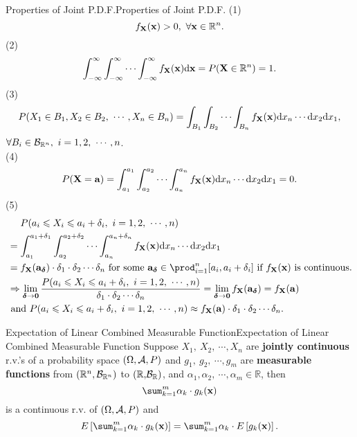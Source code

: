 \documentclass{elegantbook}
\begin{document}
\begin{remark}{Properties of Joint P.D.F.}{Properties of Joint P.D.F.}
(1)
\[f_{\mX}(\mx) > 0,\ \forall\mx \in \mathbb{R}^{n}.\]
(2)
\[\int_{- \infty}^{\infty}{\int_{- \infty}^{\infty}{\cdots\int_{- \infty}^{\infty}{f_{\mX}(\mx)\dif\mx}}} = P(\mX \in \mathbb{R}^{n}) = 1.\]
(3)
\[P( X_{1} \in B_{1},X_{2} \in B_{2},\ \cdots,X_{n} \in B_{n}) = \int_{B_{1}}^{}{\int_{B_{2}}^{}{\cdots\int_{B_{n}}^{}{f_{\mX}(\mx)\dif x_{n}\cdots \dif x_{2}}}}\dif x_{1},\]
$\forall B_{i} \in \mb_{\mathbb{R}^{n}},\ i = 1,2,\ \cdots,n$.\\
(4)
\[P(\mX = \mathbf{a}) = \int_{a_{1}}^{a_{1}}{\int_{a_{2}}^{a_{2}}{\cdots\int_{a_{n}}^{a_{n}}{f_{\mX}(\mx)\dif x_{n}\cdots \dif x_{2}}}}\dif x_{1} = 0.\]
(5)
\[\begin{aligned}
&\quad\  P(a_{i} \ls X_{i} \ls a_{i} + \delta_{i},\ i = 1,2,\ \cdots,n)\\
&= \int_{a_{1}}^{a_{1} + \delta_{1}}{\int_{a_{2}}^{a_{2} + \delta_{2}}{\cdots\int_{a_{n}}^{a_{n} + \delta_{n}}{f_{\mX}(\mx)\dif x_{n}\cdots \dif x_{2}}}}\dif x_{1}\\
&= f_{\mX}( {\mathbf{a}}_{\bm{\delta}} ) \cdot \delta_{1} \cdot \delta_{2} \cdots\delta_{n} \text{ for some }{\mathbf{a}}_{\bm{\delta}} \in \prod_{i = 1}^{n}{\lbrack a_{i},a_{i} + \delta_{i}\rbrack} \text{ if } f_{\mX}(\mx) \text{ is continuous}.\\
&\Rightarrow \lim_{\bm{\delta}\rightarrow\mathbf{0}}\frac{P(a_{i} \ls X_{i} \ls a_{i} + \delta_{i},\ i = 1,2,\ \cdots,n)}{\delta_{1} \cdot \delta_{2} \cdots \delta_{n}} = \lim_{\bm{\delta}\rightarrow\mathbf{0}}{f_{\mX}( {\mathbf{a}}_{\bm{\delta}} )} = f_{\mX}(\mathbf{a})\\
&\ \text{and } P(a_{i} \ls X_{i} \ls a_{i} + \delta_{i},\ i = 1,2,\ \cdots,n) \approx f_{\mX}(\mathbf{a}) \cdot \delta_{1} \cdot \delta_{2} \cdots\delta_{n}.\\
\end{aligned}\]
\end{remark}

\begin{corollary}{Expectation of Linear Combined Measurable Function}{Expectation of Linear Combined Measurable Function}
Suppose \(X_{1},\ X_{2},\ \cdots,X_{n}\) are \textbf{jointly continuous}
r.v.'s of a probability space $(\Omega,\mathcal{A}, P)$ and \(g_{1},\ g_{2},\ \cdots, g_{m}\) are \textbf{measurable functions} from \((\mathbb{R}^{n}, \mathcal{B}_{\mathbb{R}^{n}})\) to \(\mathbb{(R,}\mathcal{B}_{\mathbb{R}})\), and \(\alpha_{1},\alpha_{2},\ \cdots,\alpha_{m} \in \mathbb{R}\), then
\[\sum_{k = 1}^{m}\alpha_{k}\cdot g_{k}(\mx)
\]
is a continuous r.v. of $(\Omega,\mathcal{A}, P)$ and 
\[E\left\lbrack \sum_{k = 1}^{m}\alpha_{k}\cdot g_{k}(\mx) \right\rbrack = \sum_{k = 1}^{m}\alpha_{k}\cdot E\left\lbrack g_{k}(\mx) \right\rbrack.\]
\end{corollary}
\end{document}
